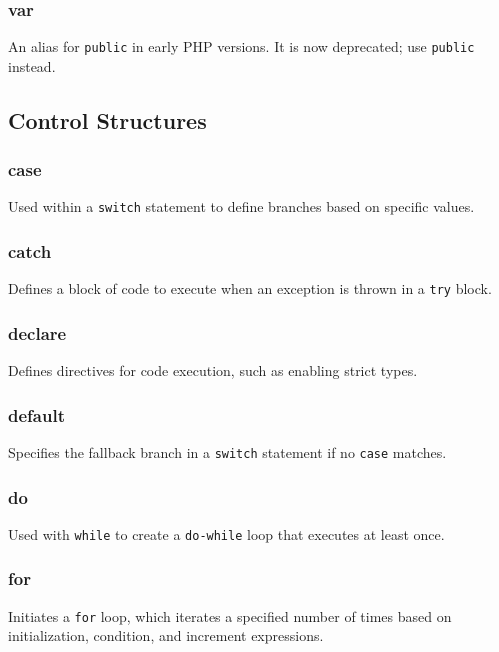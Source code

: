 \documentclass{report}
\begin{document}
\bigbreak \noindent 
\subsubsection{var}
\bigbreak \noindent 
An alias for \texttt{public} in early PHP versions. It is now deprecated; use \texttt{public} instead.

\pagebreak
\subsection{Control Structures}
\bigbreak \noindent 
\subsubsection{case}
\bigbreak \noindent 
Used within a \texttt{switch} statement to define branches based on specific values.

\bigbreak \noindent 
\subsubsection{catch}
\bigbreak \noindent 
Defines a block of code to execute when an exception is thrown in a \texttt{try} block.

\bigbreak \noindent 
\subsubsection{declare}
\bigbreak \noindent 
Defines directives for code execution, such as enabling strict types.

\bigbreak \noindent 
\subsubsection{default}
\bigbreak \noindent 
Specifies the fallback branch in a \texttt{switch} statement if no \texttt{case} matches.

\bigbreak \noindent 
\subsubsection{do}
\bigbreak \noindent 
Used with \texttt{while} to create a \texttt{do-while} loop that executes at least once.

\bigbreak \noindent 
\subsubsection{for}
\bigbreak \noindent 
Initiates a \texttt{for} loop, which iterates a specified number of times based on initialization, condition, and increment expressions.
\end{document}
